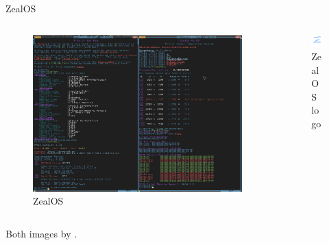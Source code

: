 \documentclass{beamer}
\begin{document}
{	\begin{frame}{ZealOS}
		\begin{columns}
			\begin{column}{0.7\textwidth}
				\begin{figure}[h]
					\centering
					\includegraphics[width=0.8\linewidth]{images/zeal_os.png}
					\caption{ZealOS}
					\label{fig:ZealOS}
				\end{figure}
			\end{column}
			\begin{column}{0.2\textwidth}
				\begin{figure}
					\centering
					\includegraphics[width=1.0\linewidth]{images/zealos_logo.png}
					\caption{ZealOS logo}
					\label{fig:zealos_logo}
				\end{figure}
			\end{column}
		\end{columns}
		\centering
		Both images by \cite{zealos_zeal-operating-systemzealos_2025}.
	\end{frame}

}
\end{document}
